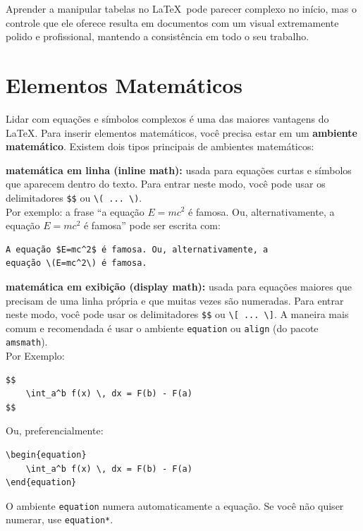 Aprender a manipular tabelas no \LaTeX\  pode parecer complexo no início, mas o controle que ele oferece resulta em documentos com um visual extremamente polido e profissional, mantendo a consistência em todo o seu trabalho.


\section{Elementos Matemáticos}

Lidar com equações e símbolos complexos é uma das maiores vantagens do \LaTeX. Para inserir elementos matemáticos, você precisa estar em um \textbf{ambiente matemático}. Existem dois tipos principais de ambientes matemáticos:

\begin{alineas}
	\item \textbf{matemática em linha (inline math):} usada para equações curtas e símbolos que aparecem dentro do texto. Para entrar neste modo, você pode usar os delimitadores \verb|$$| ou \verb|\( ... \)|.\\
	Por exemplo: a frase ``a equação $E=mc^2$ é famosa. Ou, alternativamente, a equação \(E=mc^2\) é famosa'' pode ser escrita com:
	\begin{lstlisting}[language={[LaTeX]TeX}]
A equação $E=mc^2$ é famosa. Ou, alternativamente, a
equação \(E=mc^2\) é famosa. 
	\end{lstlisting}
	
	\item \textbf{matemática em exibição (display math):} usada para equações maiores que precisam de uma linha própria e que muitas vezes são numeradas. Para entrar neste modo, você pode usar os delimitadores \verb|$$| ou \verb|\[ ... \]|. A maneira mais comum e recomendada é usar o ambiente \texttt{equation} ou \texttt{align} (do pacote \texttt{amsmath}).\\
	Por Exemplo:
	\begin{lstlisting}[language={[LaTeX]TeX}]
$$
	\int_a^b f(x) \, dx = F(b) - F(a)
$$
	\end{lstlisting}
	Ou, preferencialmente:
	\begin{lstlisting}[language={[LaTeX]TeX}]
\begin{equation}
	\int_a^b f(x) \, dx = F(b) - F(a)
\end{equation}
	\end{lstlisting}
	O ambiente \texttt{equation} numera automaticamente a equação. Se você não quiser numerar, use \texttt{equation*}.
\end{alineas}



